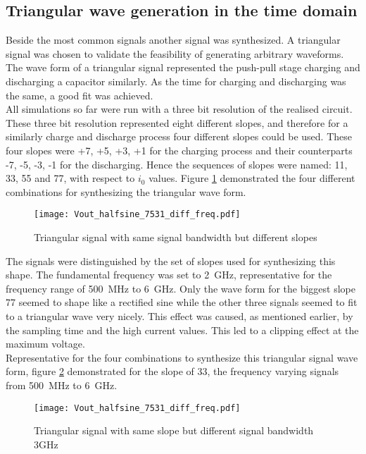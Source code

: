 \subsection{Triangular wave generation in the time domain}
Beside the most common signals another signal was synthesized.
A triangular signal was chosen to validate the feasibility of generating arbitrary waveforms.
The wave form of a triangular signal represented the push-pull stage charging and discharging a capacitor similarly.
As the time for charging and discharging was the same, a good fit was achieved.\\
All simulations so far were run with a three bit resolution of the realised circuit.
These three bit resolution represented eight different slopes, and therefore for a similarly charge and discharge process four different slopes could be used.
These four slopes were +7, +5, +3, +1 for the charging process and their counterparts -7, -5, -3, -1 for the discharging.
Hence the sequences of slopes were named: 11, 33, 55 and 77, with respect to $i_0$ values.
Figure \ref{fig:DiffSlopeSameBWTriangular} demonstrated the four different combinations for synthesizing the triangular wave form.

\begin{figure}[htb!]
	\centering
  \texttt{[image: Vout\_halfsine\_7531\_diff\_freq.pdf]}
	\caption{Triangular signal with same signal bandwidth but different slopes}
	\label{fig:DiffSlopeSameBWTriangular}
\end{figure}

The signals were distinguished by the set of slopes used for synthesizing this shape.
The fundamental frequency was set to \SI{2}{\giga \hertz}, representative for the frequency range of \SI{500}{\mega \hertz} to \SI{6}{\giga \hertz}.
Only the wave form for the biggest slope 77 seemed to shape like a rectified sine while the other three signals seemed to fit to a triangular wave very nicely.
This effect was caused, as mentioned earlier, by the sampling time and the high current values.
This led to a clipping effect at the maximum voltage.\\
Representative for the four combinations to synthesize this triangular signal wave form, 
figure \ref{fig:DiffSigBWSameSlopeTriangular} demonstrated for the slope of 33, the frequency varying signals from \SI{500}{\mega \hertz} to \SI{6}{\giga \hertz}.


\begin{figure}[htb!]
	\centering
  \texttt{[image: Vout\_halfsine\_7531\_diff\_freq.pdf]}
	\caption{Triangular signal with same slope but different signal bandwidth 3GHz}
	\label{fig:DiffSigBWSameSlopeTriangular}
\end{figure}



